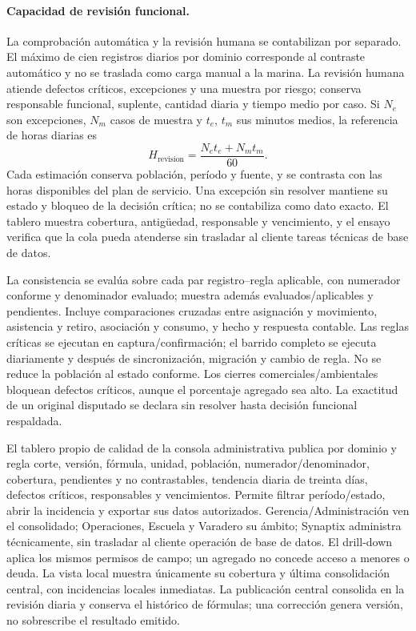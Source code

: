 \paragraph{Capacidad de revisión funcional.}
La comprobación automática y la revisión humana se contabilizan por separado. El máximo de cien registros diarios por dominio corresponde al contraste automático y no se traslada como carga manual a la marina. La revisión humana atiende defectos críticos, excepciones y una muestra por riesgo; conserva responsable funcional, suplente, cantidad diaria y tiempo medio por caso. Si $N_e$ son excepciones, $N_m$ casos de muestra y $t_e$, $t_m$ sus minutos medios, la referencia de horas diarias es
\[
 H_{\mathrm{revision}} = \frac{N_e t_e+N_m t_m}{60}.
\]
Cada estimación conserva población, período y fuente, y se contrasta con las horas disponibles del plan de servicio. Una excepción sin resolver mantiene su estado y bloqueo de la decisión crítica; no se contabiliza como dato exacto. El tablero muestra cobertura, antigüedad, responsable y vencimiento, y el ensayo verifica que la cola pueda atenderse sin trasladar al cliente tareas técnicas de base de datos.

La consistencia se evalúa sobre cada par registro--regla aplicable, con numerador conforme y denominador evaluado; muestra además evaluados/aplicables y pendientes. Incluye comparaciones cruzadas entre asignación y movimiento, asistencia y retiro, asociación y consumo, y hecho y respuesta contable. Las reglas críticas se ejecutan en captura/confirmación; el barrido completo se ejecuta diariamente y después de sincronización, migración y cambio de regla. No se reduce la población al estado conforme. Los cierres comerciales/ambientales bloquean defectos críticos, aunque el porcentaje agregado sea alto. La exactitud de un original disputado se declara sin resolver hasta decisión funcional respaldada.

El tablero propio de calidad de la consola administrativa publica por dominio y regla corte, versión, fórmula, unidad, población, numerador/denominador, cobertura, pendientes y no contrastables, tendencia diaria de treinta días, defectos críticos, responsables y vencimientos. Permite filtrar período/estado, abrir la incidencia y exportar sus datos autorizados. Gerencia/Administración ven el consolidado; Operaciones, Escuela y Varadero su ámbito; Synaptix administra técnicamente, sin trasladar al cliente operación de base de datos. El drill-down aplica los mismos permisos de campo; un agregado no concede acceso a menores o deuda. La vista local muestra únicamente su cobertura y última consolidación central, con incidencias locales inmediatas. La publicación central consolida en la revisión diaria y conserva el histórico de fórmulas; una corrección genera versión, no sobrescribe el resultado emitido.

